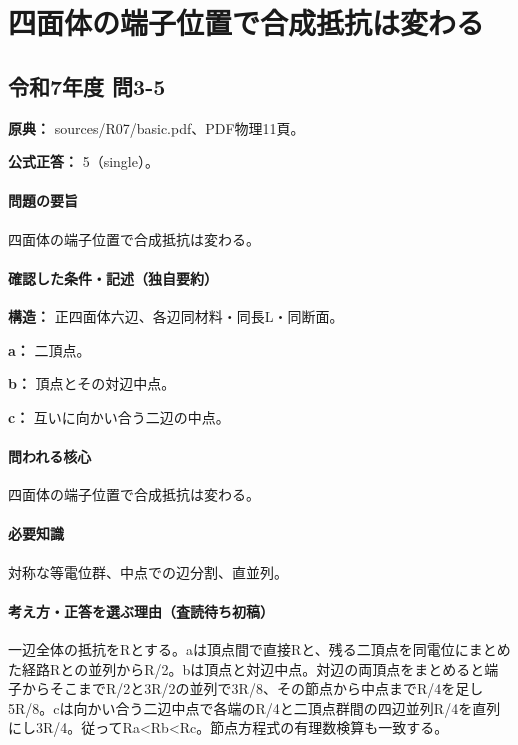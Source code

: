 \section{四面体の端子位置で合成抵抗は変わる}

\subsection{令和7年度 問3-5}
\label{q:r07-reg-basic-3-5}

\noindent\textbf{原典：} sources/R07/basic.pdf、PDF物理11頁。

\textbf{公式正答：} 5（single）。

\paragraph{問題の要旨} 四面体の端子位置で合成抵抗は変わる。

\paragraph{確認した条件・記述（独自要約）}\mbox{}\par

\noindent\textbf{構造：} 正四面体六辺、各辺同材料・同長L・同断面。\par

\noindent\textbf{a：} 二頂点。\par

\noindent\textbf{b：} 頂点とその対辺中点。\par

\noindent\textbf{c：} 互いに向かい合う二辺の中点。\par

\paragraph{問われる核心} 四面体の端子位置で合成抵抗は変わる。

\paragraph{必要知識} 対称な等電位群、中点での辺分割、直並列。

\paragraph{考え方・正答を選ぶ理由（査読待ち初稿）} 一辺全体の抵抗をRとする。aは頂点間で直接Rと、残る二頂点を同電位にまとめた経路Rとの並列からR/2。bは頂点と対辺中点。対辺の両頂点をまとめると端子からそこまでR/2と3R/2の並列で3R/8、その節点から中点までR/4を足し5R/8。cは向かい合う二辺中点で各端のR/4と二頂点群間の四辺並列R/4を直列にし3R/4。従ってRa<Rb<Rc。節点方程式の有理数検算も一致する。

